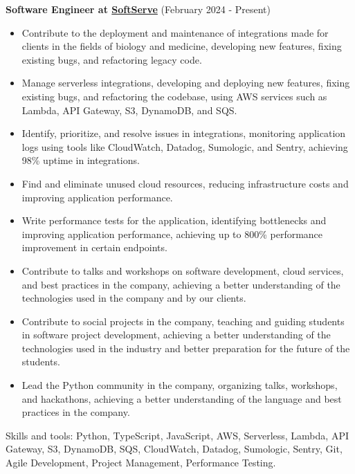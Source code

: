   \vspace*{0.2cm}
  \textbf{Software Engineer at \href{https://www.softserveinc.com/en-us}{SoftServe}} (February 2024 - Present)
  \hfill
  \vspace*{0.2cm}
  \begin{minipage}{\linewidth}
    \begin{itemize}[noitemsep]
      \item Contribute to the deployment and maintenance of integrations made for clients in the fields of biology and medicine, developing new features, fixing existing bugs, and refactoring legacy code.
      \item Manage serverless integrations, developing and deploying new features, fixing existing bugs, and refactoring the codebase, using AWS services such as Lambda, API Gateway, S3, DynamoDB, and SQS.
      \item Identify, prioritize, and resolve issues in integrations, monitoring application logs using tools like CloudWatch, Datadog, Sumologic, and Sentry, achieving 98\% uptime in integrations.
      \item Find and eliminate unused cloud resources, reducing infrastructure costs and improving application performance.
      \item Write performance tests for the application, identifying bottlenecks and improving application performance, achieving up to 800\% performance improvement in certain endpoints.
      \item Contribute to talks and workshops on software development, cloud services, and best practices in the company, achieving a better understanding of the technologies used in the company and by our clients.
      \item Contribute to social projects in the company, teaching and guiding students in software project development, achieving a better understanding of the technologies used in the industry and better preparation for the future of the students.
      \item Lead the Python community in the company, organizing talks, workshops, and hackathons, achieving a better understanding of the language and best practices in the company.
    \end{itemize}
    \hfill
  \end{minipage}
  Skills and tools: Python, TypeScript, JavaScript, AWS, Serverless, Lambda, API Gateway, S3, DynamoDB, SQS, CloudWatch, Datadog, Sumologic, Sentry, Git, Agile Development, Project Management, Performance Testing.

